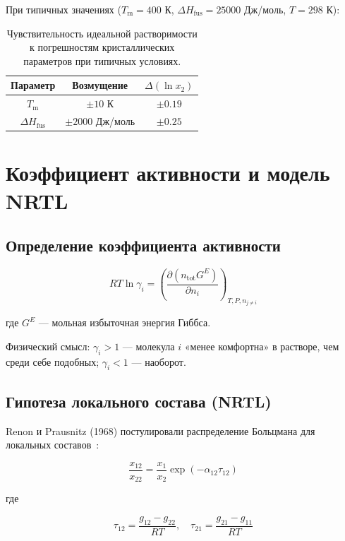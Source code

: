 \documentclass[11pt]{article}
\begin{document}
При типичных значениях ($T_{\mathrm{m}} = 400$ К, $\Delta H_{\mathrm{fus}} = 25000$ Дж/моль, $T = 298$ К):

\begin{table}[H]
\centering
\begin{tabular}{|c|c|c|}
\hline
Параметр & Возмущение & $\Delta(\ln x_2)$ \\
\hline
$T_{\mathrm{m}}$ & $\pm 10$ К & $\pm 0.19$ \\
\hline
$\Delta H_{\mathrm{fus}}$ & $\pm 2000$ Дж/моль & $\pm 0.25$ \\
\hline
\end{tabular}
\caption{Чувствительность идеальной растворимости к погрешностям кристаллических параметров при типичных условиях.}
\end{table}

\section{Коэффициент активности и модель NRTL}

\subsection{Определение коэффициента активности}

\begin{equation*}
RT \ln \gamma_i = \left(\frac{\partial (n_{\mathrm{tot}} G^E)}{\partial n_i}\right)_{T, P, n_{j \neq i}}
\end{equation*}

где $G^E$ --- мольная избыточная энергия Гиббса.

Физический смысл: $\gamma_i > 1$ --- молекула $i$ «менее комфортна» в растворе, чем среди себе подобных; $\gamma_i < 1$ --- наоборот.

\subsection{Гипотеза локального состава (NRTL)}

Renon и Prausnitz (1968) постулировали распределение Больцмана для локальных составов~\cite{renon1968}:

\begin{equation*}
\frac{x_{12}}{x_{22}} = \frac{x_1}{x_2} \exp(-\alpha_{12}\tau_{12})
\end{equation*}

где

\begin{equation*}
\tau_{12} = \frac{g_{12} - g_{22}}{RT}, \quad \tau_{21} = \frac{g_{21} - g_{11}}{RT}
\end{equation*}
\end{document}
